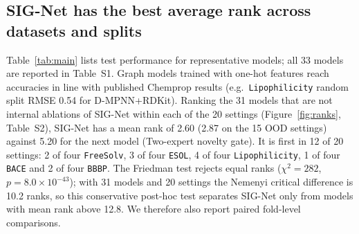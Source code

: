 \documentclass[journal=jcisd8,manuscript=article]{achemso}
\begin{document}
\subsection{SIG-Net has the best average rank across datasets and splits}
Table~\ref{tab:main} lists test performance for representative models; all 33 models are reported in Table~S1. Graph models trained with one-hot features reach accuracies in line with published Chemprop results (e.g.\ \texttt{Lipophilicity} random split RMSE 0.54 for D-MPNN+RDKit). Ranking the 31 models that are not internal ablations of SIG-Net within each of the 20 settings (Figure~\ref{fig:ranks}, Table~S2), SIG-Net has a mean rank of 2.60 (2.87 on the 15 OOD settings) against 5.20 for the next model (Two-expert novelty gate). It is first in 12 of 20 settings: 2 of four \texttt{FreeSolv}, 3 of four \texttt{ESOL}, 4 of four \texttt{Lipophilicity}, 1 of four \texttt{BACE} and 2 of four \texttt{BBBP}. The Friedman test rejects equal ranks ($\chi^2 = 282$, $p = 8.0 \times 10^{-43}$); with 31 models and 20 settings the Nemenyi critical difference is 10.2 ranks, so this conservative post-hoc test separates SIG-Net only from models with mean rank above 12.8. We therefore also report paired fold-level comparisons.
\end{document}
